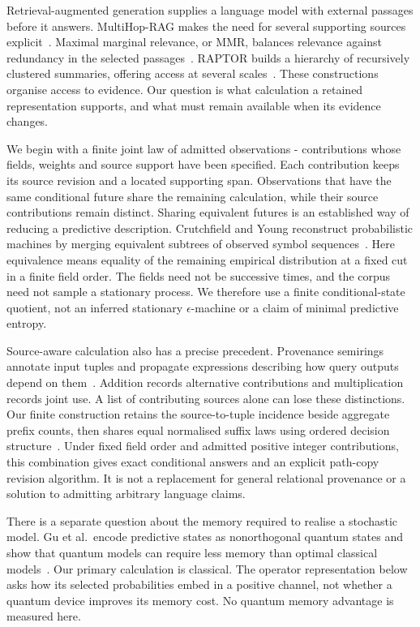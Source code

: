 \documentclass[reprint,aps,prx,superscriptaddress,nofootinbib,longbibliography]{revtex4-2}
\begin{document}
Retrieval-augmented generation supplies a language model with external passages before it answers.
MultiHop-RAG makes the need for several supporting sources explicit~\cite{multihoprag}.
Maximal marginal relevance, or MMR, balances relevance against redundancy in the selected passages~\cite{mmr}.
RAPTOR builds a hierarchy of recursively clustered summaries, offering access at several scales~\cite{raptor}.
These constructions organise access to evidence.
Our question is what calculation a retained representation supports, and what must remain available when its evidence changes.

We begin with a finite joint law of admitted observations - contributions whose fields, weights and source support have been specified.
Each contribution keeps its source revision and a located supporting span.
Observations that have the same conditional future share the remaining calculation, while their source contributions remain distinct.
Sharing equivalent futures is an established way of reducing a predictive description.
Crutchfield and Young reconstruct probabilistic machines by merging equivalent subtrees of observed symbol sequences~\cite{Crutchfield198940eaeb}.
Here equivalence means equality of the remaining empirical distribution at a fixed cut in a finite field order.
The fields need not be successive times, and the corpus need not sample a stationary process.
We therefore use a finite conditional-state quotient, not an inferred stationary \(\epsilon\)-machine or a claim of minimal predictive entropy.

Source-aware calculation also has a precise precedent.
Provenance semirings annotate input tuples and propagate expressions describing how query outputs depend on them~\cite{Green20074d5218}.
Addition records alternative contributions and multiplication records joint use.
A list of contributing sources alone can lose these distinctions.
Our finite construction retains the source-to-tuple incidence beside aggregate prefix counts, then shares equal normalised suffix laws using ordered decision structure~\cite{bryant1986}.
Under fixed field order and admitted positive integer contributions, this combination gives exact conditional answers and an explicit path-copy revision algorithm.
It is not a replacement for general relational provenance or a solution to admitting arbitrary language claims.

There is a separate question about the memory required to realise a stochastic model.
Gu et al.\ encode predictive states as nonorthogonal quantum states and show that quantum models can require less memory than optimal classical models~\cite{Gu2012e2bbbd}.
Our primary calculation is classical.
The operator representation below asks how its selected probabilities embed in a positive channel, not whether a quantum device improves its memory cost.
No quantum memory advantage is measured here.
\end{document}
